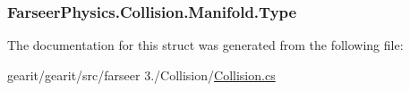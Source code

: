 \hypertarget{struct_farseer_physics_1_1_collision_1_1_manifold_a4bd0e0439598b8525f6cbdc69e296736}{
\subsubsection[{Type}]{ Farseer\+Physics.\+Collision.\+Manifold.\+Type}}\label{struct_farseer_physics_1_1_collision_1_1_manifold_a4bd0e0439598b8525f6cbdc69e296736}


The documentation for this struct was generated from the following file\+:\begin{DoxyCompactItemize}
\item 
gearit/gearit/src/farseer 3./\+Collision/\hyperlink{_collision_8cs}{Collision.\+cs}\end{DoxyCompactItemize}
